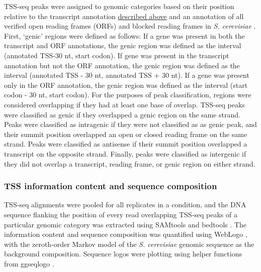 TSS-seq peaks were assigned to genomic categories based on their position relative to the transcript annotation \hyperref[subsubsec:tss_reannotation]{described above} and an annotation of all verified open reading frames (ORFs) and blocked reading frames in \textit{S. cerevisiae} \citep{crooks2004, engel2014}.
First, `genic' regions were defined as follows: If a gene was present in both the transcript and ORF annotations, the genic region was defined as the interval (annotated TSS-30 nt, start codon).
If gene was present in the transcript annotation but not the ORF annotation, the genic region was defined as the interval (annotated TSS - 30 nt, annotated TSS + 30 nt).
If a gene was present only in the ORF annotation, the genic region was defined as the interval (start codon - 30 nt, start codon).
For the purposes of peak classification, regions were considered overlapping if they had at least one base of overlap.
TSS-seq peaks were classified as genic if they overlapped a genic region on the same strand.
Peaks were classified as intragenic if they were not classified as as genic peak, and their summit position overlapped an open or closed reading frame on the same strand.
Peaks were classified as antisense if their summit position overlapped a transcript on the opposite strand.
Finally, peaks were classified as intergenic if they did not overlap a transcript, reading frame, or genic region on either strand.

\subsubsection{TSS information content and sequence composition}

TSS-seq alignments were pooled for all replicates in a condition, and the DNA sequence flanking the position of every read overlapping TSS-seq peaks of a particular genomic category was extracted using SAMtools \citep{li2009} and bedtools \citep{quinlan2010}.
The information content and sequence composition was quantified using WebLogo \citep{crooks2004}, with the zeroth-order Markov model of the \textit{S. cerevisiae} genomic sequence as the background composition.
Sequence logos were plotting using helper functions from ggseqlogo \citep{wagih2017}.

